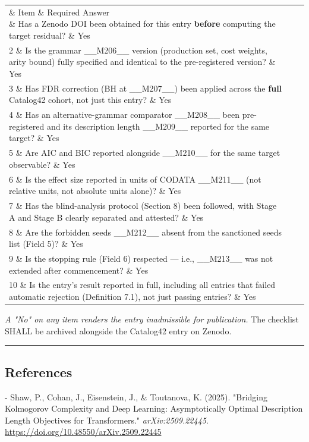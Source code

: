 \begin{tabular}{|l|l|l|}
\hline
\section{\& Item \& Required Answer \\}
\hline
1 \& Has a Zenodo DOI been obtained for this entry \textbf{before} computing the target residual? \& Yes \\
2 \& Is the grammar \_\_M206\_\_ version (production set, cost weights, arity bound) fully specified and identical to the pre-registered version? \& Yes \\
3 \& Has FDR correction (BH at \_\_M207\_\_) been applied across the \textbf{full} Catalog42 cohort, not just this entry? \& Yes \\
4 \& Has an alternative-grammar comparator \_\_M208\_\_ been pre-registered and its description length \_\_M209\_\_ reported for the same target? \& Yes \\
5 \& Are AIC and BIC reported alongside \_\_M210\_\_ for the same target observable? \& Yes \\
6 \& Is the effect size reported in units of CODATA \_\_M211\_\_ (not relative units, not absolute units alone)? \& Yes \\
7 \& Has the blind-analysis protocol (Section 8) been followed, with Stage A and Stage B clearly separated and attested? \& Yes \\
8 \& Are the forbidden seeds \_\_M212\_\_ absent from the sanctioned seeds list (Field 5)? \& Yes \\
9 \& Is the stopping rule (Field 6) respected --- i.e., \_\_M213\_\_ was not extended after commencement? \& Yes \\
10 \& Is the entry's result reported in full, including all entries that failed automatic rejection (Definition 7.1), not just passing entries? \& Yes \\
\hline
\end{tabular}
\textit{A "No" on any item renders the entry inadmissible for publication.} The checklist SHALL be archived alongside the Catalog42 entry on Zenodo.

\noindent\rule{\textwidth}{0.4pt}

\subsection{References}

- Shaw, P., Cohan, J., Eisenstein, J., \& Toutanova, K. (2025). "Bridging Kolmogorov Complexity and Deep Learning: Asymptotically Optimal Description Length Objectives for Transformers." \textit{arXiv:2509.22445}. \href{https://doi.org/10.48550/arXiv.2509.22445}{https://doi.org/10.48550/arXiv.2509.22445}

